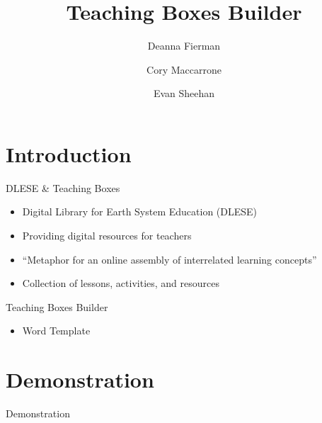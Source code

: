 \documentclass[style=simple,mode=present,paper=screen]{powerdot}
\title{Teaching Boxes Builder}
\author{
	Deanna Fierman
	\and
	Cory Maccarrone
	\and
	Evan Sheehan
}
\begin{document}
\maketitle

\section[slide=false]{Introduction}
\begin{slide}{DLESE \& Teaching Boxes}
\begin{itemize}
\item Digital Library for Earth System Education (DLESE)
\item Providing digital resources for teachers
\item ``Metaphor for an online assembly of interrelated learning concepts''
\item Collection of lessons, activities, and resources
\end{itemize}
\end{slide}

\begin{slide}{Teaching Boxes Builder}
\begin{itemize}
\item Word Template
\end{itemize}
\end{slide}

\section[slide=false]{Demonstration}
\begin{slide}[toc=,bm=]{Demonstration}
\end{slide}
\end{document}
